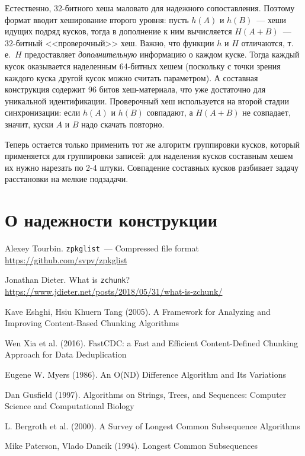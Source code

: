 \documentclass[russian,a4paper,12pt]{article}
\begin{document}
Естественно, 32-битного хеша маловато для надежного сопоставления.  Поэтому формат вводит хеширование второго уровня:
пусть $h(A)$ и $h(B)$~--- хеши идущих подряд кусков, тогда в дополнение к ним вычисляется $H(A+B)$~--- 32-битный <<проверочный>>
хеш.  Важно, что функции $h$ и $H$ отличаются, т.\,е.~$H$ предоставляет \textit{дополнительную} информацию о каждом куске.
Тогда каждый кусок оказывается наделенным 64-битных хешем (поскольку с точки зрения каждого куска другой кусок можно считать
параметром).  А составная конструкция содержит 96 битов хеш-материала, что уже достаточно для уникальной идентификации.
Проверочный хеш используется на второй стадии синхронизации: если $h(A)$ и $h(B)$ совпадают, а $H(A+B)$ не совпадает, значит,
куски $A$ и $B$ надо скачать повторно.

Теперь остается только применить тот же алгоритм группировки кусков, который применяется для группировки записей:
для наделения кусков составным хешем их нужно нарезать по 2-4 штуки.  Совпадение составных кусков разбивает задачу
расстановки на мелкие подзадачи.

\section{О надежности конструкции}

\begin{thebibliography}{9}

Alexey Tourbin. \verb|zpkglist|~--- Compressed file format\\
\url{https://github.com/svpv/zpkglist}

Jonathan Dieter. What is \verb|zchunk|?\\
\url{https://www.jdieter.net/posts/2018/05/31/what-is-zchunk/}

Kave Eshghi, Hsiu Khuern Tang (2005).
A Framework for Analyzing and Improving Content-Based Chunking Algorithms

Wen Xia et al. (2016).
FastCDC: a Fast and Efficient Content-Defined Chunking Approach for Data Deduplication

Eugene W. Myers (1986).  An O(ND) Difference Algorithm and Its Variations

Dan Gusfield (1997).  Algorithms on Strings, Trees, and Sequences:
Computer Science and Computational Biology

L. Bergroth et al. (2000).  A Survey of Longest Common Subsequence Algorithms

Mike Paterson, Vlado Dancik (1994).  Longest Common Subsequences

\end{thebibliography}
\end{document}
